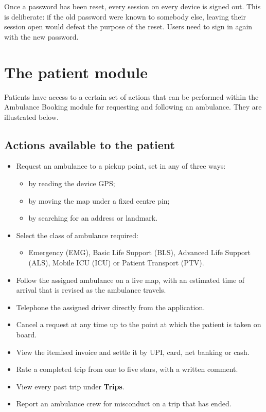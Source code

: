 \documentclass[11pt,a4paper]{article}
\begin{document}
\begin{warnbox}
Once a password has been reset, every session on every device is signed out.
This is deliberate: if the old password were known to somebody else, leaving
their session open would defeat the purpose of the reset. Users need to sign in
again with the new password.
\end{warnbox}

\section{The patient module}
\label{sec:patient}

Patients have access to a certain set of actions that can be performed within
the Ambulance Booking module for requesting and following an ambulance. They
are illustrated below.

\subsection{Actions available to the patient}

\begin{itemize}
  \item Request an ambulance to a pickup point, set in any of three ways:
    \begin{itemize}
      \item by reading the device GPS;
      \item by moving the map under a fixed centre pin;
      \item by searching for an address or landmark.
    \end{itemize}
  \item Select the class of ambulance required:
    \begin{itemize}
      \item Emergency (EMG), Basic Life Support (BLS), Advanced Life Support
            (ALS), Mobile ICU (ICU) or Patient Transport (PTV).
    \end{itemize}
  \item Follow the assigned ambulance on a live map, with an estimated time of
        arrival that is revised as the ambulance travels.
  \item Telephone the assigned driver directly from the application.
  \item Cancel a request at any time up to the point at which the patient is
        taken on board.
  \item View the itemised invoice and settle it by UPI, card, net banking or
        cash.
  \item Rate a completed trip from one to five stars, with a written comment.
  \item View every past trip under \textbf{Trips}.
  \item Report an ambulance crew for misconduct on a trip that has ended.
\end{itemize}
\end{document}
